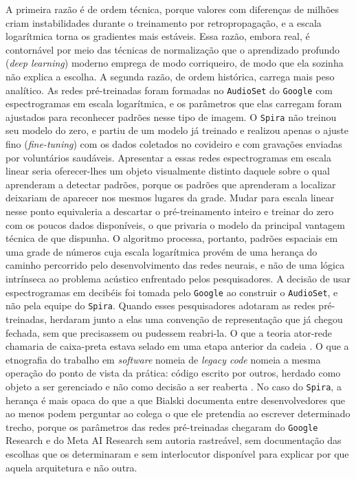 A primeira razão é de ordem técnica, porque valores com diferenças de milhões criam instabilidades durante o treinamento por retropropagação, e a escala logarítmica torna os gradientes mais estáveis. Essa razão, embora real, é contornável por meio das técnicas de normalização que o aprendizado profundo (\textit{deep learning}) moderno emprega de modo corriqueiro, de modo que ela sozinha não explica a escolha. A segunda razão, de ordem histórica, carrega mais peso analítico. As redes pré-treinadas foram formadas no \texttt{AudioSet} do \texttt{Google} com espectrogramas em escala logarítmica, e os parâmetros que elas carregam foram ajustados para reconhecer padrões nesse tipo de imagem. O \texttt{Spira} não treinou seu modelo do zero, e partiu de um modelo já treinado e realizou apenas o ajuste fino (\textit{fine-tuning}) com os dados coletados no covideiro e com gravações enviadas por voluntários saudáveis. Apresentar a essas redes espectrogramas em escala linear seria oferecer-lhes um objeto visualmente distinto daquele sobre o qual aprenderam a detectar padrões, porque os padrões que aprenderam a localizar deixariam de aparecer nos mesmos lugares da grade. Mudar para escala linear nesse ponto equivaleria a descartar o pré-treinamento inteiro e treinar do zero com os poucos dados disponíveis, o que privaria o modelo da principal vantagem técnica de que dispunha. O algoritmo processa, portanto, padrões espaciais em uma grade de números cuja escala logarítmica provém de uma herança do caminho percorrido pelo desenvolvimento das redes neurais, e não de uma lógica intrínseca ao problema acústico enfrentado pelos pesquisadores. A decisão de usar espectrogramas em decibéis foi tomada pelo \texttt{Google} ao construir o \texttt{AudioSet}, e não pela equipe do \texttt{Spira}. Quando esses pesquisadores adotaram as redes pré-treinadas, herdaram junto a elas uma convenção de representação que já chegou fechada, sem que precisassem ou pudessem reabri-la. O que a teoria ator-rede chamaria de caixa-preta estava selado em uma etapa anterior da cadeia \parencite{Latour2011CienciaEmAcao}. O que a etnografia do trabalho em \textit{software} nomeia de \textit{legacy code} nomeia a mesma operação do ponto de vista da prática: código escrito por outros, herdado como objeto a ser gerenciado e não como decisão a ser reaberta \parencite{Bialski2024MiddleTech}. No caso do \texttt{Spira}, a herança é mais opaca do que a que Bialski documenta entre desenvolvedores que ao menos podem perguntar ao colega o que ele pretendia ao escrever determinado trecho, porque os parâmetros das redes pré-treinadas chegaram do \texttt{Google} Research e do Meta AI Research sem autoria rastreável, sem documentação das escolhas que os determinaram e sem interlocutor disponível para explicar por que aquela arquitetura e não outra.


